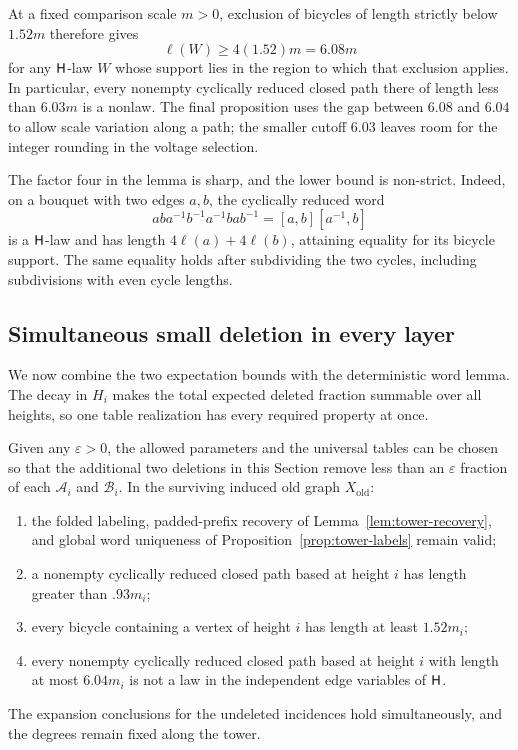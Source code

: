 At a fixed comparison scale $m>0$, exclusion of bicycles of length
strictly below $1.52m$ therefore gives
\[
  \ell(W)\geq4(1.52)m=6.08m
\]
for any $\mathsf H$-law $W$ whose support lies in the region to which that
exclusion applies.  In particular, every nonempty cyclically reduced
closed path there of length less than $6.03m$ is a nonlaw.
The final proposition uses the gap between $6.08$ and $6.04$ to allow
scale variation along a path; the smaller cutoff $6.03$ leaves room
for the integer rounding in the voltage selection.

The factor four in the lemma is sharp, and the lower bound is
non-strict.  Indeed, on a bouquet with two edges
$a,b$, the cyclically reduced word
\[
  aba^{-1}b^{-1}a^{-1}bab^{-1}
      =[a,b][a^{-1},b]
\]
is a $\mathsf H$-law and has length $4\ell(a)+4\ell(b)$, attaining equality
for its bicycle support.  The same equality holds after subdividing
the two cycles, including subdivisions with even cycle lengths.


\subsection{Simultaneous small deletion in every layer}

We now combine the two expectation bounds with the deterministic word
lemma.  The decay in $H_i$ makes the total expected deleted fraction
summable over all heights, so one table realization has every required
property at once.

\begin{proposition}
\label{prop:pruning}
Given any $\varepsilon>0$, the allowed parameters and the
universal tables can be chosen so that the additional two
deletions in this Section remove less than an $\varepsilon$
fraction of each $\mathscr A_i$ and $\mathscr B_i$.
In the surviving induced old graph $X_{\mathrm{old}}$:
\begin{enumerate}
 \item the folded labeling, padded-prefix recovery of
 Lemma~\ref{lem:tower-recovery}, and global word uniqueness of
 Proposition~\ref{prop:tower-labels} remain valid;
 \item a nonempty cyclically reduced closed path based at height
 $i$ has length greater than $.93m_i$;
 \item every bicycle containing a vertex of height $i$ has
 length at least $1.52m_i$;
 \item every nonempty cyclically reduced closed path based at
 height $i$ with length at most $6.04m_i$ is not a law in
 the independent edge variables of $\mathsf H$.
\end{enumerate}
The expansion conclusions for the undeleted incidences hold
simultaneously, and the degrees remain fixed along the tower.
\end{proposition}

